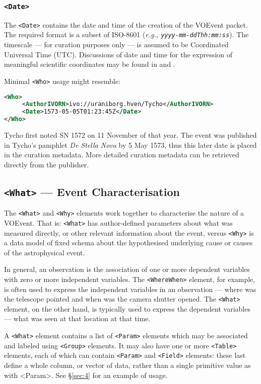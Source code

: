 \documentclass[11pt,a4paper]{ivoa}
\begin{document}
\subsubsection{\texttt{<Date>}}
The \verb|<Date>| contains the date and time of the creation of the VOEvent
packet. The required format is a subset of ISO-8601 (\emph{e.g.,
\texttt{yyyy-mm-ddThh:mm:ss}}). The timescale --- for curation purposes only --- is
assumed to be Coordinated Universal Time (UTC). Discussions of date and time for
the expression of meaningful scientific coordinates may be found in
\citep{2007ivoa.spec.1030R} and \citep{bib26}.


Minimal \verb|<Who>| usage might resemble:
\begin{lstlisting}[language=XML]
<Who>
     <AuthorIVORN>ivo://uraniborg.hven/Tycho</AuthorIVORN>
     <Date>1573-05-05T01:23:45Z</Date>
</Who>
\end{lstlisting}
Tycho first noted SN 1572 on 11 November of that year. The event was published
in Tycho's pamphlet \emph{De Stella Nova} by 5 May 1573, thus this later date is
placed in the curation metadata. More detailed curation metadata can be
retrieved directly from the publisher.


\subsection{\texttt{<What>} --- Event Characterisation}
\label{sec:3.3}
The \verb|<What>| and \verb|<Why>| elements work together to characterise the
nature of a VOEvent. That is: \verb|<What>| has author-defined parameters about
what was measured directly, or other relevant information about the event,
versus \verb|<Why>| is a data model of fixed schema about the hypothesised
underlying cause or causes of the astrophysical event.

In general, an observation is the association of one or more dependent variables
with zero or more independent variables. The \verb|<WhereWhen>| element, for
example, is often used to express the independent variables in an observation
--- where was the telescope pointed and when was the camera shutter opened. The
\verb|<What>| element, on the other hand, is typically used to express the
dependent variables --- what was seen at that location at that time.

A \verb|<What>| element contains a list of \verb|<Param>| elements which may be
associated and labeled using \verb|<Group>| elements. It may also have one or
more \verb|<Table>| elements, each of which can contain \verb|<Param>| and \verb|<Field>|
elements: these last define a whole column, or vector of data, rather than a
single primitive value as with <Param>. See \S\ref{sec:4} for an example of
usage.
\end{document}
